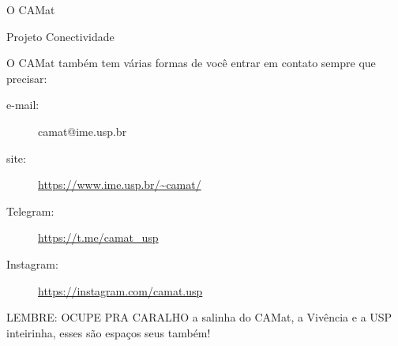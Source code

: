 \begin{secao}{O CAMat}
\begin{subsecao}{Projeto Conectividade}
\end{subsecao}


O CAMat também tem várias formas de você entrar em contato sempre que precisar:

\begin{description}
\item [e-mail:] camat@ime.usp.br
\item [site:] \url{https://www.ime.usp.br/~camat/}
\item [Telegram:] \url{https://t.me/camat_usp}
\item [Instagram:] \url{https://instagram.com/camat.usp}
\end{description}

LEMBRE: OCUPE PRA CARALHO a salinha do CAMat, a Vivência e a USP inteirinha, esses são espaços seus também!


\end{secao}
